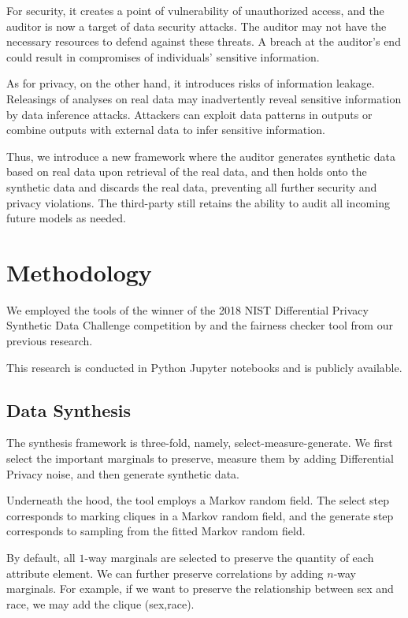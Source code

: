 \documentclass[manuscript,screen,review,anonymous]{acmart}
\begin{document}
For security, it creates a point of vulnerability of unauthorized access, and the auditor is now a target of data security attacks. The auditor may not have the necessary resources to defend against these threats. A breach at the auditor's end could result in compromises of individuals' sensitive information.

As for privacy, on the other hand, it introduces risks of information leakage. Releasings of analyses on real data may inadvertently reveal sensitive information by data inference attacks. Attackers can exploit data patterns in outputs or combine outputs with external data to infer sensitive information.

Thus, we introduce a new framework where the auditor generates synthetic data based on real data upon retrieval of the real data, and then holds onto the synthetic data and discards the real data, preventing all further security and privacy violations. The third-party still retains the ability to audit all incoming future models as needed.

\section{Methodology}
\label{sec:method}

We employed the tools of the winner of the 2018 NIST Differential Privacy Synthetic Data Challenge competition\cite{NIST2018} by \cite{nist_ryan_2018,McKenna_Private-PGM_2021,mckenna2021winning,mckenna2019graphical} and the fairness checker tool from our previous research\cite{yuan2024ensuring}.

This research is conducted in Python Jupyter notebooks and is publicly available.

\subsection{Data Synthesis}

The synthesis framework is three-fold, namely, select-measure-generate\cite{McKenna2022,YouTube_Differentially_Private_Synthetic_Data}. We first select the important marginals to preserve, measure them by adding Differential Privacy noise, and then generate synthetic data.

Underneath the hood, the tool employs a Markov random field. The select step corresponds to marking cliques in a Markov random field, and the generate step corresponds to sampling from the fitted Markov random field.

By default, all $1$-way marginals are selected to preserve the quantity of each attribute element. We can further preserve correlations by adding $n$-way marginals. For example, if we want to preserve the relationship between sex and race, we may add the clique (sex,race).
\end{document}
